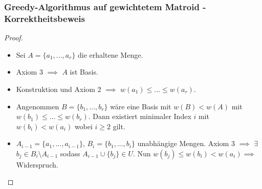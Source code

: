 \begin{frame}
    \frametitle{Greedy-Algorithmus auf gewichtetem Matroid - Korrektheitsbeweis}
 {
    \begin{proof}
    		\begin{itemize}
    			\item<1-> Sei $A = \{ a_{1},...,a_{r}\}$ die erhaltene Menge.
    			\item<2-> Axiom 3 $\implies$ $A$ ist Basis.
    			\item<3-> Konstruktion und Axiom 2 $\implies$ $w(a_{1}) \leq ... \leq w(a_{r})$. 
    			\item<4-> Angenommen $B = \{ b_{1},...,b_{r}\}$ wäre eine Basis mit $w(B) < w(A)$ mit $w(b_{1}) \leq ... \leq w(b_{r})$. Dann existiert minimaler Index $i$ mit $w(b_{i}) < w(a_{i})$ wobei $i \geq 2$ gilt. 
    			\item<5-> $A_{i-1} = \{ a_{1},...,a_{i-1}\}$, $B_{i} = \{ b_{1},...,b_{i}\}$ unabhängige Mengen. Axiom 3 $\implies$ $\exists$ $b_{j} \in B_{i} \setminus A_{i-1}$ sodass $A_{i-1} \cup \{ b_{j}\} \in U$. Nun $w(b_{j}) \leq w(b_{i}) < w(a_{i}) \implies$ Widerspruch.
    		\end{itemize}
    		
    \end{proof}
}
\end{frame}